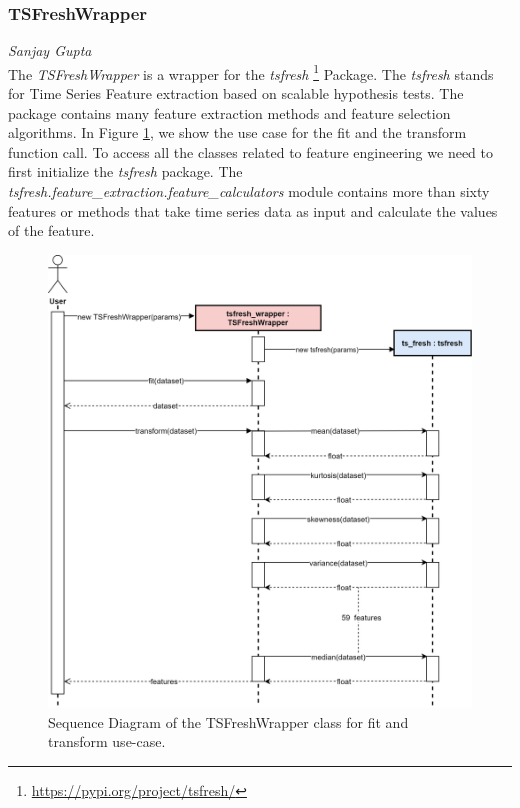 \subsubsection*{TSFreshWrapper}
\vspace*{-10mm}\hfill{\normalsize\emph{Sanjay Gupta}}
\\
The \textit{TSFreshWrapper} is a wrapper for the \textit{tsfresh} \footnote{\href{https://pypi.org/project/tsfresh/}{https://pypi.org/project/tsfresh/}} Package. The \textit{tsfresh} stands for Time Series Feature extraction based on scalable hypothesis tests. The package contains many feature extraction methods and feature selection algorithms. In Figure \ref{fig:tsfresh-wrapper-seq}, we show the use case for the fit and the transform function call. To access all the classes related to feature engineering we need to first initialize the \textit{tsfresh} package. The \textit{tsfresh.feature\_extraction.feature\_calculators} module contains more than sixty features or methods that take time series data as input and calculate the values of the feature.
\begin{figure}[ht]
    \centering
    \includegraphics[width=\textwidth]{gfx/TSFreshWrapper-Sequence}
    \caption{Sequence Diagram of the TSFreshWrapper class for fit and transform use-case.}
    \label{fig:tsfresh-wrapper-seq}
\end{figure}
